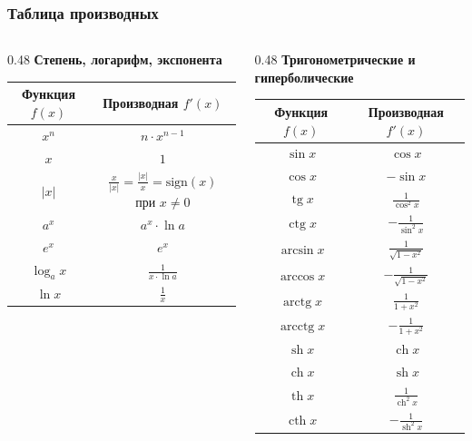 \documentclass[8pt, aspectratio=169]{beamer}
\begin{document}
\begin{frame}
    \frametitle{Таблица производных}

    \begin{columns}[T, onlytextwidth]

    \begin{column}{0.48\textwidth}
    \centering
    \textbf{Степень, логарифм, экспонента}
    \vspace{0.2cm}

    \begin{tabular}{|c|c|}
    \hline
    Функция $f(x)$ & Производная $f'(x)$ \\
    \hline
    $x^n$ & $n \cdot x^{n-1}$ \\
    \hline
    $x$ & $1$ \\
    \hline
    $|x|$ & $\frac{x}{|x|} = \frac{|x|}{x} = \text{sign}(x)$ при $x \ne 0$ \\
    \hline
    $a^x$ & $a^x \cdot \ln a$ \\
    \hline
    $e^x$ & $e^x$ \\
    \hline
    $\log_a x$ & $\frac{1}{x \cdot \ln a}$ \\
    \hline
    $\ln x$ & $\frac{1}{x}$ \\
    \hline
    \end{tabular}
    \end{column}

    \begin{column}{0.48\textwidth}
    \centering
    \textbf{Тригонометрические и гиперболические}
    \vspace{0.2cm}

    \begin{tabular}{|c|c|}
    \hline
    Функция $f(x)$ & Производная $f'(x)$ \\
    \hline
    $\sin x$ & $\cos x$ \\
    \hline
    $\cos x$ & $-\sin x$ \\
    \hline
    $\operatorname{tg} x$ & $\frac{1}{\cos^2 x}$ \\
    \hline
    $\operatorname{ctg} x$ & $-\frac{1}{\sin^2 x}$ \\
    \hline
    $\arcsin x$ & $\frac{1}{\sqrt{1 - x^2}}$ \\
    \hline
    $\arccos x$ & $-\frac{1}{\sqrt{1 - x^2}}$ \\
    \hline
    $\operatorname{arctg} x$ & $\frac{1}{1 + x^2}$ \\
    \hline
    $\operatorname{arcctg} x$ & $-\frac{1}{1 + x^2}$ \\
    \hline
    $\operatorname{sh} x$ & $\operatorname{ch} x$ \\
    \hline
    $\operatorname{ch} x$ & $\operatorname{sh} x$ \\
    \hline
    $\operatorname{th} x$ & $\frac{1}{\operatorname{ch}^2 x}$ \\
    \hline
    $\operatorname{cth} x$ & $-\frac{1}{\operatorname{sh}^2 x}$ \\
    \hline
    \end{tabular}
    \end{column}


\end{columns}
\end{frame}
\end{document}
